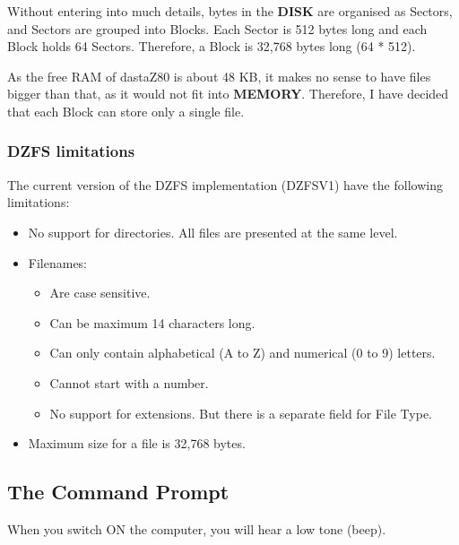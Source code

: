 \documentclass[a4paper,11pt]{article}
\begin{document}
    Without entering into much details, bytes in the \textbf{DISK} are organised
    as Sectors, and Sectors are grouped into Blocks. Each Sector is 512 bytes
    long and each Block holds 64 Sectors. Therefore, a Block is 32,768 bytes
    long (64 * 512).

    As the free RAM of dastaZ80 is about 48 KB, it makes no sense to have files
    bigger than that, as it would not fit into \textbf{MEMORY}. Therefore, I
    have decided that each Block can store only a single file.

    \subsubsection{DZFS limitations}
    The current version of the DZFS implementation (DZFSV1) have the following
    limitations:

    \begin{itemize}
        \item No support for directories. All files are presented at the same
        level.
        \item Filenames:
        \begin{itemize}
            \item Are case sensitive.
            \item Can be maximum 14 characters long.
            \item Can only contain alphabetical (A to Z) and numerical (0 to 9)
            letters.
            \item Cannot start with a number.
            \item No support for extensions. But there is a separate field for
            File Type.
        \end{itemize}
        \item Maximum size for a file is 32,768 bytes.
    \end{itemize}
        
    \pagebreak
    \subsection{The Command Prompt}
    When you switch ON the computer, you will hear a low tone (beep).
    
\end{document}
